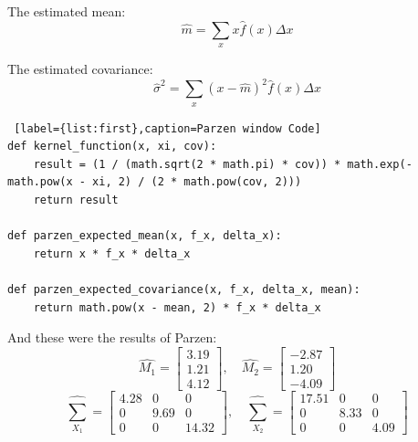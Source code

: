 \documentclass[11pt, oneside]{article}   	%
\begin{document}
The estimated mean:
$$\hat{m}=\sum_{x}x\hat{f}(x)\Delta x $$

The estimated covariance:
$$\hat{\sigma}^2=\sum_{x}(x-\hat{m})^2\hat{f}(x)\Delta x$$

\begin{lstlisting} [label={list:first},caption=Parzen window Code]
def kernel_function(x, xi, cov):
    result = (1 / (math.sqrt(2 * math.pi) * cov)) * math.exp(-math.pow(x - xi, 2) / (2 * math.pow(cov, 2)))
    return result

def parzen_expected_mean(x, f_x, delta_x):
    return x * f_x * delta_x

def parzen_expected_covariance(x, f_x, delta_x, mean):
    return math.pow(x - mean, 2) * f_x * delta_x
\end{lstlisting}

And these were the results of Parzen:$$\hat{M_1} = \begin{bmatrix}
3.19 \\ 1.21 \\ 4.12 
\end{bmatrix},\quad \hat{M_2} = \begin{bmatrix}
-2.87 \\ 1.20 \\ -4.09 
\end{bmatrix}$$
$$\hat{\sum_{X_1}} = \begin{bmatrix}
4.28 & 0 & 0 \\
0 & 9.69 & 0 \\
0 & 0 & 14.32 
\end{bmatrix}, \quad \hat{\sum_{X_2}} = \begin{bmatrix}
17.51 & 0 & 0 \\
0 & 8.33 & 0 \\
0 & 0 & 4.09 
\end{bmatrix}$$\\
\end{document}
